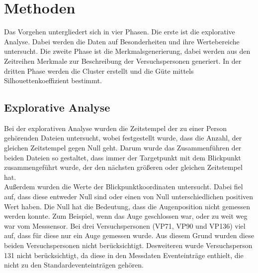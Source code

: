 \documentclass[12pt]{article}
\begin{document}
\section*{Methoden}
Das Vorgehen untergliedert sich in vier Phasen. Die erste ist die explorative Analyse. Dabei werden die Daten auf Besonderheiten und ihre Wertebereiche untersucht. Die zweite Phase ist die Merkmalsgenerierung, dabei werden aus den Zeitreihen Merkmale zur Beschreibung der Versuchspersonen generiert. In der dritten Phase werden die Cluster erstellt und die G\"ute mittels Silhouettenkoeffizient bestimmt.

\subsection*{Explorative Analyse}
Bei der explorativen Analyse wurden die Zeitstempel der zu einer Person geh\"orenden Dateien untersucht, wobei festgestellt wurde, dass die Anzahl, der gleichen Zeitstempel gegen Null geht. Darum wurde das Zusammenf\"uhren der beiden Dateien so gestaltet, dass immer der Targetpunkt mit dem Blickpunkt zusammengef\"uhrt wurde, der den n\"achsten gr\"o\ss{}eren oder gleichen Zeitstempel hat.\\
Au\ss{}erdem wurden die Werte der Blickpunktkoordinaten untersucht. Dabei fiel auf, dass diese entweder Null sind oder einen von Null unterschiedlichen positiven Wert haben. Die Null hat die Bedeutung, dass die Augenposition nicht gemessen werden konnte. Zum Beispiel, wenn das Auge geschlossen war, oder zu weit weg war vom Messsensor. Bei drei Versuchspersonen (VP71, VP90 und VP136) viel auf, dass f\"ur diese nur ein Auge gemessen wurde. Aus diesem Grund wurden diese beiden Versuchspersonen nicht ber\"ucksichtigt. Desweiteren wurde Versuchsperson 131 nicht ber\"ucksichtigt, da diese in den Messdaten Eventeintr\"age enthielt, die nicht zu den Standardeventeintr\"agen geh\"oren.
\end{document}
